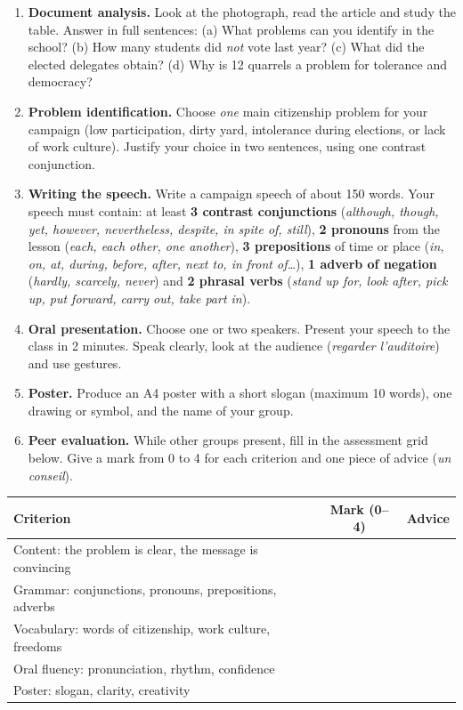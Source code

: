 \documentclass[11pt]{article}
\newcommand{\cle}[1]{{\popxbold\color{popdark}#1}}
\begin{document}
\begin{enumerate}
\item \textbf{Document analysis.} Look at the photograph, read the article and study the table. Answer in full sentences: (a) What problems can you identify in the school? (b) How many students did \emph{not} vote last year? (c) What did the elected delegates obtain? (d) Why is 12 quarrels a problem for tolerance and democracy?
\item \textbf{Problem identification.} Choose \emph{one} main citizenship problem for your campaign (low participation, dirty yard, intolerance during elections, or lack of work culture). Justify your choice in two sentences, using one contrast conjunction.
\item \textbf{Writing the speech.} Write a campaign speech of about \cle{150 words}. Your speech must contain: at least \textbf{3 contrast conjunctions} (\emph{although, though, yet, however, nevertheless, despite, in spite of, still}), \textbf{2 pronouns} from the lesson (\emph{each, each other, one another}), \textbf{3 prepositions} of time or place (\emph{in, on, at, during, before, after, next to, in front of\ldots}), \textbf{1 adverb of negation} (\emph{hardly, scarcely, never}) and \textbf{2 phrasal verbs} (\emph{stand up for, look after, pick up, put forward, carry out, take part in}).
\item \textbf{Oral presentation.} Choose one or two speakers. Present your speech to the class in 2 minutes. Speak clearly, look at the audience (\emph{regarder l'auditoire}) and use gestures.
\item \textbf{Poster.} Produce an A4 poster with a short slogan (maximum 10 words), one drawing or symbol, and the name of your group.
\item \textbf{Peer evaluation.} While other groups present, fill in the assessment grid below. Give a mark from 0 to 4 for each criterion and one piece of advice (\emph{un conseil}).
\end{enumerate}

\begin{center}
\begin{tabularx}{\linewidth}{|X|c|c|}\hline
\rowcolor{popblueL} \textbf{Criterion} & \textbf{Mark (0--4)} & \textbf{Advice} \\ \hline
Content: the problem is clear, the message is convincing & & \\ \hline
Grammar: conjunctions, pronouns, prepositions, adverbs & & \\ \hline
Vocabulary: words of citizenship, work culture, freedoms & & \\ \hline
Oral fluency: pronunciation, rhythm, confidence & & \\ \hline
Poster: slogan, clarity, creativity & & \\ \hline
\end{tabularx}
\end{center}
\end{document}
